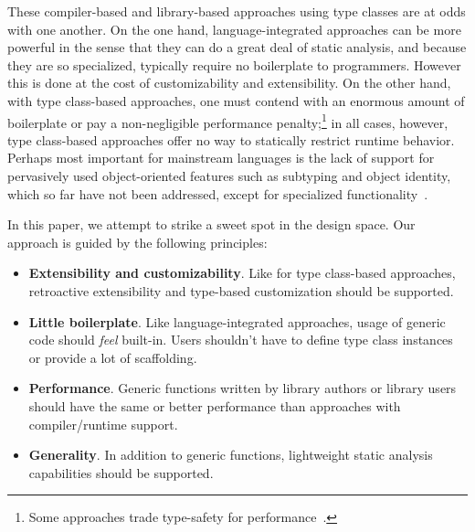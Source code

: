 \documentclass[preprint,nocopyrightspace]{sigplanconf}
\begin{document}
These compiler-based and library-based approaches using type classes are at
odds with one another. On the one hand, language-integrated approaches can be
more powerful in the sense that they can do a great deal of static analysis,
and because they are so specialized, typically require no boilerplate to
programmers. However this is done at the cost of customizability and
extensibility. On the other hand,
with type class-based approaches, one must contend with an enormous amount of
boilerplate or pay a non-negligible performance penalty;\footnote{Some
approaches trade type-safety for performance~\cite{TemplateYourBoilerplate}.}
in all cases, however, type class-based approaches offer no way to statically
restrict runtime behavior. Perhaps most important for mainstream languages is
the lack of support for pervasively used object-oriented features such as
subtyping and object identity, which so far have not been addressed, except for
specialized functionality~\cite{Pickling}.

In this paper, we attempt to strike a sweet spot in the design space. Our
approach is guided by the following principles:

\begin{itemize}
\item\textbf{Extensibility and customizability}. Like for type class-based
     approaches, retroactive extensibility and type-based customization
     should be supported.

\item\textbf{Little boilerplate}. Like language-integrated approaches, usage
     of generic code should \emph{feel} built-in. Users shouldn't have to define
     type class instances or provide a lot of scaffolding.

\item\textbf{Performance}. Generic functions written by library authors or library
     users should have the same or better performance than approaches with
     compiler/runtime support.

\item\textbf{Generality}. In addition to generic functions, lightweight static
     analysis capabilities should be supported.
\end{itemize}
\end{document}
